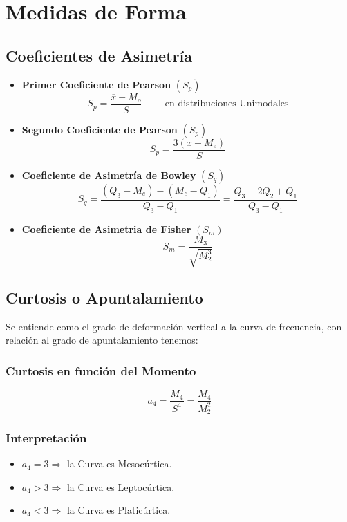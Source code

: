 \section{Medidas de Forma}
\subsection{Coeficientes de Asimetría}
\begin{itemize}
\item \textbf{Primer Coeficiente de Pearson} $(S_p)$
$$S_p=\dfrac{\overline{x}-M_o}{S} \hspace{1cm} \textrm{en distribuciones Unimodales}$$
\item \textbf{Segundo Coeficiente de Pearson} $(S_p)$
$$S_p=\dfrac{3(\overline{x}-M_e)}{S}$$
\item \textbf{Coeficiente de Asimetría de Bowley} $(S_q)$
$$S_q=\dfrac{(Q_3-M_e)-(M_e-Q_1)}{Q_3-Q_1}=\dfrac{Q_3-2Q_2+Q_1}{Q_3-Q_1}$$
\item \textbf{Coeficiente de Asimetria de Fisher} $(S_m)$
$$S_m = \dfrac{M_3}{\sqrt{M_2^3}}$$
\end{itemize}
\subsection{Curtosis o Apuntalamiento}
Se entiende como el grado de deformación vertical a la curva de frecuencia, con relación al grado de apuntalamiento tenemos:
\begin{center}
\end{center}
\subsubsection{Curtosis en función del Momento}
$$a_4=\dfrac{M_4}{S^4}=\dfrac{M_4}{M_2^2}$$
\subsubsection{Interpretación}
\begin{itemize}
\item $a_4=3\Rightarrow$ la Curva es Mesocúrtica.
\item $a_4>3\Rightarrow$ la Curva es Leptocúrtica.
\item $a_4<3\Rightarrow$ la Curva es Platicúrtica.
\end{itemize}
